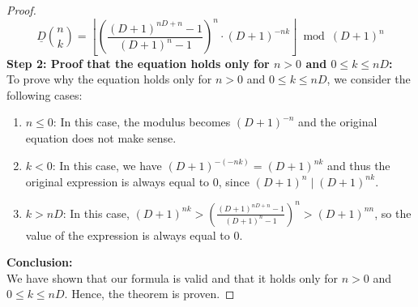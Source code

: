 \documentclass{article}
\theoremstyle{plain}
\begin{document}
\begin{proof}
\begin{equation}
\underline{D}\binom{n}{k} = \left\lfloor \left(\frac{(D+1)^{nD+n} - 1}{(D+1)^{n} - 1}\right)^n \cdot (D + 1)^{-n k}\right\rfloor \bmod (D + 1)^n
\end{equation}
\textbf{Step 2: Proof that the equation holds only for $n > 0$ and $0 \leq k \leq nD$:} \\
To prove why the equation holds only for $n > 0$ and $0 \leq k \leq nD$, we consider the following cases:
\begin{enumerate}
\item $n \leq 0$: In this case, the modulus becomes $(D+1)^{-n}$ and the original equation does not make sense.
\item $k < 0$: In this case, we have $(D+1)^{-(-nk)} = (D+1)^{nk}$ and thus the original expression is always equal to $0$, since $(D+1)^{n} \mid (D+1)^{nk}$.
\item $k > nD$: In this case, $(D+1)^{nk} > \left(\frac{(D + 1)^{n D + n} - 1}{(D + 1)^{n} - 1}\right)^{n} > (D+1)^{nn}$, so the value of the expression is always equal to $0$.
\end{enumerate}
\noindent
\textbf{Conclusion:}
\\
We have shown that our formula is valid and that it holds only for $n > 0$ and $0 \leq k \leq nD$. Hence, the theorem is proven.
\end{proof}
\end{document}
